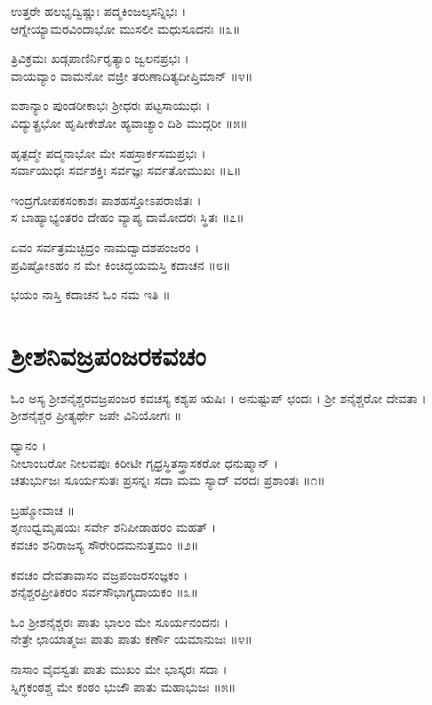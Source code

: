 ಉತ್ತರೇ ಹಲಭೃದ್ವಿಷ್ಣುಃ ಪದ್ಮಕಿಂಜಲ್ಕಸನ್ನಿಭಃ ।\\
ಆಗ್ನೇಯ್ಯಾಮರವಿಂದಾಭೋ ಮುಸಲೀ ಮಧುಸೂದನಃ ॥೩॥

ತ್ರಿವಿಕ್ರಮಃ ಖಡ್ಗಪಾಣಿರ್ನಿರೃತ್ಯಾಂ ಜ್ವಲನಪ್ರಭಃ ।\\
ವಾಯವ್ಯಾಂ ವಾಮನೋ ವಜ್ರೀ ತರುಣಾದಿತ್ಯದೀಪ್ತಿಮಾನ್ ॥೪॥

ಐಶಾನ್ಯಾಂ ಪುಂಡರೀಕಾಭಃ ಶ್ರೀಧರಃ ಪಟ್ಟಸಾಯುಧಃ ।\\
ವಿದ್ಯುತ್ಪ್ರಭೋ ಹೃಷೀಕೇಶೋ ಹ್ಯವಾಚ್ಯಾಂ ದಿಶಿ ಮುದ್ಗರೀ ॥೫॥

ಹೃತ್ಪದ್ಮೇ ಪದ್ಮನಾಭೋ ಮೇ ಸಹಸ್ರಾರ್ಕಸಮಪ್ರಭಃ ।\\
ಸರ್ವಾಯುಧಃ ಸರ್ವಶಕ್ತಿಃ ಸರ್ವಜ್ಞಃ ಸರ್ವತೋಮುಖಃ ॥೬॥

ಇಂದ್ರಗೋಪಕಸಂಕಾಶಃ ಪಾಶಹಸ್ತೋಽಪರಾಜಿತಃ ।\\
ಸ ಬಾಹ್ಯಾಭ್ಯಂತರಂ ದೇಹಂ ವ್ಯಾಪ್ಯ ದಾಮೋದರಃ ಸ್ಥಿತಃ ॥೭॥

ಏವಂ ಸರ್ವತ್ರಮಚ್ಛಿದ್ರಂ ನಾಮದ್ವಾದಶಪಂಜರಂ ।\\
ಪ್ರವಿಷ್ಟೋಽಹಂ ನ ಮೇ ಕಿಂಚಿದ್ಭಯಮಸ್ತಿ ಕದಾಚನ ॥೮॥

ಭಯಂ ನಾಸ್ತಿ ಕದಾಚನ ಓಂ ನಮ ಇತಿ ॥

\section{ಶ್ರೀಶನಿವಜ್ರಪಂಜರಕವಚಂ}
ಓಂ ಅಸ್ಯ ಶ್ರೀಶನೈಶ್ಚರವಜ್ರಪಂಜರ ಕವಚಸ್ಯ ಕಶ್ಯಪ ಋಷಿಃ । ಅನುಷ್ಟುಪ್ ಛಂದಃ । ಶ್ರೀ ಶನೈಶ್ಚರೋ ದೇವತಾ । ಶ್ರೀಶನೈಶ್ಚರ ಪ್ರೀತ್ಯರ್ಥೇ ಜಪೇ ವಿನಿಯೋಗಃ ॥

ಧ್ಯಾನಂ ।\\
ನೀಲಾಂಬರೋ ನೀಲವಪುಃ ಕಿರೀಟೀ ಗೃಧ್ರಸ್ಥಿತಸ್ತ್ರಾಸಕರೋ ಧನುಷ್ಮಾನ್ ।\\
ಚತುರ್ಭುಜಃ ಸೂರ್ಯಸುತಃ ಪ್ರಸನ್ನಃ ಸದಾ ಮಮ ಸ್ಯಾದ್ ವರದಃ ಪ್ರಶಾಂತಃ ॥೧॥

ಬ್ರಹ್ಮೋವಾಚ ॥\\
ಶೃಣುಧ್ವಮೃಷಯಃ ಸರ್ವೇ ಶನಿಪೀಡಾಹರಂ ಮಹತ್ ।\\
ಕವಚಂ ಶನಿರಾಜಸ್ಯ ಸೌರೇರಿದಮನುತ್ತಮಂ ॥೨॥

ಕವಚಂ ದೇವತಾವಾಸಂ ವಜ್ರಪಂಜರಸಂಜ್ಞಕಂ ।\\
ಶನೈಶ್ಚರಪ್ರೀತಿಕರಂ ಸರ್ವಸೌಭಾಗ್ಯದಾಯಕಂ ॥೩॥

ಓಂ ಶ್ರೀಶನೈಶ್ಚರಃ ಪಾತು ಭಾಲಂ ಮೇ ಸೂರ್ಯನಂದನಃ ।\\
ನೇತ್ರೇ ಛಾಯಾತ್ಮಜಃ ಪಾತು ಪಾತು ಕರ್ಣೌ ಯಮಾನುಜಃ ॥೪॥

ನಾಸಾಂ ವೈವಸ್ವತಃ ಪಾತು ಮುಖಂ ಮೇ ಭಾಸ್ಕರಃ ಸದಾ ।\\
ಸ್ನಿಗ್ಧಕಂಠಶ್ಚ ಮೇ ಕಂಠಂ ಭುಜೌ ಪಾತು ಮಹಾಭುಜಃ ॥೫॥

